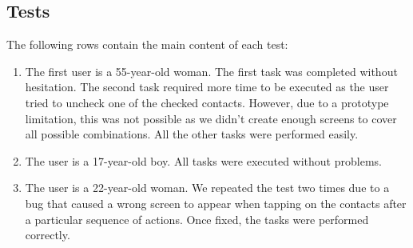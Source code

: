 \documentclass[12pt]{article}
\begin{document}
\subsection{Tests}
The following rows contain the main content of each test:
\begin{enumerate}
    \item The first user is a 55-year-old woman. The first task was completed 
    without hesitation. The second task required more time to be 
    executed as the user tried to uncheck one of the checked contacts. 
    However, due to a prototype limitation, this was not possible as we 
    didn't create enough screens to cover all possible combinations. 
    All the other tasks were performed easily. 

    \item The user is a 17-year-old boy. All tasks were executed 
    without problems. 

    \item The user is a 22-year-old woman. We repeated the test two times 
    due to a bug that caused a wrong screen to appear when tapping on the contacts after a particular sequence of actions. Once fixed, the tasks 
    were performed correctly. 
\end{enumerate}
\end{document}
